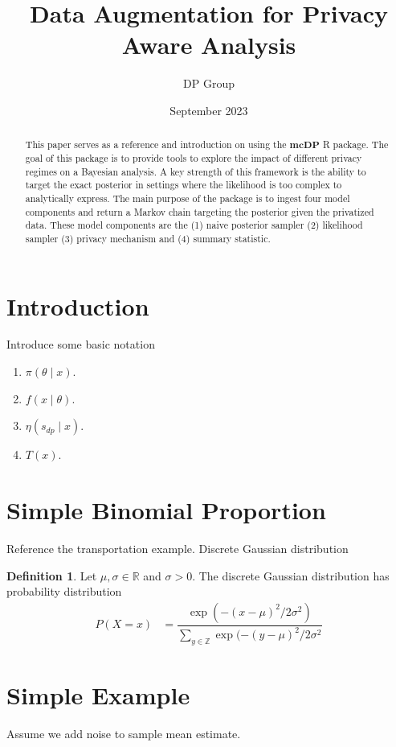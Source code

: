 \documentclass{article}\usepackage[]{graphicx}\usepackage[]{xcolor}
\title{Data Augmentation for Privacy Aware Analysis}
\author{DP Group}
\date{September 2023}
\theoremstyle{definition}
\newtheorem{definition}{Definition}[section]
\newcommand{\dpn}{\textbf{mcDP}}
\begin{document}
\maketitle

\begin{abstract}
    This paper serves as a reference and introduction on using the $\dpn$ R
    package. The goal of this package is to provide tools to explore the
    impact of different privacy regimes on a Bayesian analysis. A key strength of
    this framework is the ability to target the exact posterior in settings
    where the likelihood is too complex to analytically express. The main
    purpose of the package is to ingest four model components and return
    a Markov chain targeting the posterior given the privatized data. These
    model components are the (1) naive posterior sampler (2) likelihood sampler
    (3) privacy mechanism and (4) summary statistic.
\end{abstract}

\section*{Introduction}
Introduce some basic notation

\begin{enumerate}
  \item $\pi(\theta \mid x)$.
  \item $f(x \mid \theta)$.
  \item $\eta(s_{dp} \mid x)$.
  \item $T(x)$.
\end{enumerate}

\section*{Simple Binomial Proportion}
Reference the transportation example. Discrete Gaussian distribution

\begin{definition}
Let $\mu, \sigma \in \mathbb{R}$  and $\sigma > 0$. The discrete Gaussian
distribution has probability distribution
\begin{align*}
P(X = x) &= \dfrac{\exp(-(x-\mu)^2/2\sigma^2)}{\sum_{y \in \mathbb{Z}} \exp(-(y-\mu)^2/2\sigma^2}
\end{align*}
\end{definition}

\section*{Simple Example}
Assume we add noise to sample mean estimate.
\end{document}
